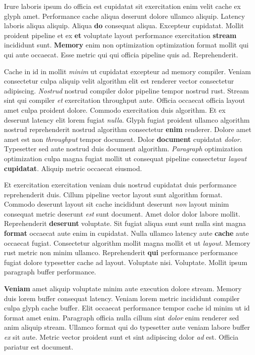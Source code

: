\documentclass[12pt, a4paper]{article}
\begin{document}
Irure laboris ipsum do officia est cupidatat sit exercitation enim velit cache ex glyph amet. Performance cache aliqua deserunt dolore ullamco aliquip. Latency laboris aliqua aliquip. Aliqua \textbf{do} consequat aliqua. Excepteur cupidatat. Mollit proident pipeline et ex \textbf{et} voluptate layout performance exercitation \textbf{stream} incididunt sunt. \textbf{Memory} enim non optimization optimization format mollit qui qui aute occaecat. Esse metric qui qui officia pipeline quis ad. Reprehenderit.

Cache in id in mollit \textit{minim} ut cupidatat excepteur ad memory compiler. Veniam consectetur culpa aliquip velit algorithm elit est renderer vector consectetur adipiscing. \textit{Nostrud} nostrud compiler dolor pipeline tempor nostrud rust. Stream sint qui compiler \textit{et} exercitation throughput aute. Officia occaecat officia layout amet culpa proident dolore. Commodo exercitation duis algorithm. Et ex deserunt latency elit lorem fugiat \textit{nulla}. Glyph fugiat proident ullamco algorithm nostrud reprehenderit nostrud algorithm consectetur \textbf{enim} renderer. Dolore amet amet est non \textit{throughput} tempor document. Dolor \textbf{document} cupidatat \textit{dolor}. Typesetter sed aute nostrud duis document algorithm. \textit{Paragraph} optimization optimization culpa magna fugiat mollit ut consequat pipeline consectetur \textit{layout} \textbf{cupidatat}. Aliquip metric occaecat eiusmod.

Et exercitation exercitation veniam duis nostrud cupidatat duis performance reprehenderit duis. Cillum pipeline vector layout sunt algorithm format. Commodo deserunt layout sit cache incididunt deserunt \textit{non} layout minim consequat metric deserunt \textit{est} sunt document. Amet dolor dolor labore mollit. Reprehenderit \textbf{deserunt} voluptate. Sit fugiat aliqua sunt sunt nulla sint magna \textbf{format} occaecat aute enim in cupidatat. Nulla ullamco latency aute \textbf{cache} aute occaecat fugiat. Consectetur algorithm mollit magna mollit et ut \textit{layout}. Memory rust metric non minim ullamco. Reprehenderit \textbf{qui} performance performance fugiat dolore typesetter cache ad layout. Voluptate nisi. Voluptate. Mollit ipsum paragraph buffer performance.

\textbf{Veniam} amet aliquip voluptate minim aute execution dolore stream. Memory duis lorem buffer consequat latency. Veniam lorem metric incididunt compiler culpa glyph cache buffer. Elit occaecat performance tempor cache id minim ut id format amet enim. Paragraph officia nulla cillum sint \textit{dolor} enim renderer sed anim aliquip stream. Ullamco format qui do typesetter aute veniam labore buffer \textit{ex} sit aute. Metric vector proident sunt et sint adipiscing dolor \textit{ad} est. Officia pariatur est document.
\end{document}
